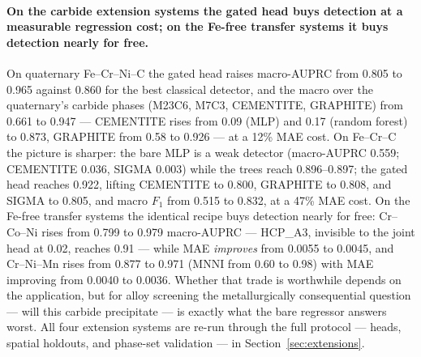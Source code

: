 \documentclass[preprint,12pt,authoryear]{elsarticle}
\begin{document}
\paragraph{On the carbide extension systems the gated head buys detection
at a measurable regression cost; on the Fe-free transfer systems it buys
detection nearly for free.}
On quaternary Fe--Cr--Ni--C the gated head raises macro-AUPRC from 0.805
to 0.965 against 0.860 for the best classical detector, and the macro over
the quaternary's carbide phases (M23C6, M7C3, CEMENTITE, GRAPHITE) from
0.661 to 0.947 --- CEMENTITE rises from 0.09 (MLP) and 0.17
(random forest) to 0.873, GRAPHITE from 0.58 to 0.926 --- at a 12\% MAE
cost. On Fe--Cr--C the picture is sharper: the bare MLP is a weak
detector (macro-AUPRC 0.559; CEMENTITE 0.036, SIGMA 0.003) while the
trees reach 0.896--0.897; the gated head reaches 0.922, lifting CEMENTITE
to 0.800, GRAPHITE to 0.808, and SIGMA to 0.805, and macro $F_1$ from
0.515 to 0.832, at a 47\% MAE cost. On the Fe-free transfer systems the
identical recipe buys detection nearly for free: Cr--Co--Ni rises from
0.799 to 0.979 macro-AUPRC --- HCP\_A3, invisible to the joint head at
0.02, reaches 0.91 --- while MAE \emph{improves} from 0.0055 to 0.0045,
and Cr--Ni--Mn rises from 0.877 to 0.971 (MNNI from 0.60 to 0.98) with
MAE improving from 0.0040 to 0.0036. Whether that trade is worthwhile
depends on the application, but for alloy screening the metallurgically
consequential question --- will this carbide precipitate --- is exactly
what the bare regressor answers worst. All four extension systems are re-run
through the full protocol --- heads, spatial holdouts, and phase-set
validation --- in Section~\ref{sec:extensions}.
\end{document}
